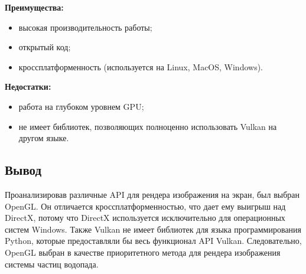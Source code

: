 \textbf{Преимущества:} 
\begin{itemize}
    \item высокая производительность работы;
    \item открытый код;
    \item кроссплатформенность (используется на Linux, MacOS, Windows).
\end{itemize}

\textbf{Недостатки:} 
\begin{itemize}
    \item работа на глубоком уровнем GPU;
    \item не имеет библиотек, позволяющих полноценно использовать Vulkan на другом языке.
\end{itemize}


\subsection*{Вывод}

Проанализировав различные API для рендера изображения на экран, был выбран OpenGL. Он отличается кроссплатформенностью, что дает ему выигрыш над DirectX, потому что DirectX используется исключительно для операционных систем Windows. Также Vulkan не имеет библиотек для языка программирования Python, которые предоставляли бы весь функционал API Vulkan. Следовательно, OpenGL выбран в качестве приоритетного метода для рендера изображения системы частиц водопада. 






